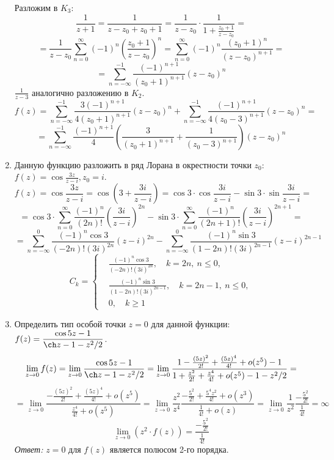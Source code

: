 \documentclass[14pt, a4paper, titlepage, fleqn]{extarticle}
\newcommand{\otv}{\textit{Ответ:} }
\begin{document}
\begin{enumerate}
        Разложим в \( K_3 \): 
        \[
            \frac{1}{z+1} = \frac{1}{z-z_0+z_0+1} = \frac{1}{z-z_0} \cdot \frac{1}{1+\frac{z_0+1}{z-z_0}} =
        \]
        \[
            = \frac{1}{z-z_0} \sum_{n=0}^{\infty} (-1)^n \left( \frac{z_0+1}{z-z_0} \right)^n = \sum_{n=0}^{\infty} (-1)^n \frac{(z_0+1)^n}{(z-z_0)^{n+1}} =
        \]
        \[
            = \sum_{n=-\infty}^{-1} \frac{(-1)^{n+1}}{(z_0+1)^{n+1}} (z-z_0)^n
        \]
        \( \displaystyle \frac{1}{z-3} \) аналогично разложению в \( K_2 \). 
        \[
            f(z) = \sum_{n=-\infty}^{-1} \frac{3(-1)^{n+1}}{4(z_0+1)^{n+1}} (z-z_0)^n + \sum_{n=-\infty}^{-1} \frac{(-1)^{n+1}}{4(z_0-3)^{n+1}} (z-z_0)^n =
        \]
        \[
            = \sum_{n=-\infty}^{-1} \frac{(-1)^{n+1}}{4} \left( \frac{3}{(z_0+1)^{n+1}} + \frac{1}{(z_0-3)^{n+1}}\right) (z-z_0)^n
        \]

        
        \pagebreak

        \item Данную функцию разложить в ряд Лорана в окрестности точки \( z_0 \): \( \displaystyle f(z) = \cos \frac{3z}{z-i}, z_0 = i \).
        \[
            f(z) = \cos \frac{3z}{z-i} = \cos \left( 3 + \frac{3i}{z-i} \right) = \cos 3 \cdot \cos \frac{3i}{z-i} - \sin 3 \cdot \sin \frac{3i}{z-i} =
        \]
        \[
            = \cos 3 \cdot \sum_{n=0}^{\infty} \frac{(-1)^n}{(2n)!} \left( \frac{3i}{z-i} \right)^{2n}  - \sin 3 \cdot \sum_{n=0}^{\infty} \frac{(-1)^n}{(2n+1)!} \left( \frac{3i}{z-i} \right)^{2n+1} =
        \]
        \[
            = \sum_{n=-\infty}^{0} \frac{(-1)^n \cos 3}{(-2n)! (3i)^{2n}} \left( z-i \right)^{2n}  - \sum_{n=-\infty}^{0} \frac{(-1)^n \sin 3}{(1-2n)! (3i)^{2n-1}} \left( z-i \right)^{2n-1}
        \]
        \[
            C_k = \left\lbrace
                \begin{aligned}
                    &\frac{(-1)^n \cos 3}{(-2n)! (3i)^{2n}}, \quad k = 2n, ~ n \leq 0, \\
                    &\frac{(-1)^n \sin 3}{(1-2n)! (3i)^{2n-1}}, \quad k = 2n-1, ~ n \leq 0, \\
                    &0, \quad k \geq 1
                \end{aligned}
            \right.
        \]  

        \item Определить тип особой точки \( z = 0 \) для данной функции: \( \displaystyle f(z) = \frac{\cos 5z -1 }{\ch z - 1 - z^2/2} \).
        \[
            \lim\limits_{z\to 0} f(z) = \lim\limits_{z\to 0} \frac{\cos 5z -1 }{\ch z - 1 - z^2/2} =
            \lim\limits_{z\to 0} \frac{1 - \frac{(5z)^2}{2!} + \frac{(5z)^4}{4!} + o(z^5) -1 }{1 + \frac{z^2}{2!} + \frac{z^4}{4!} + o(z^5) - 1 - z^2/2} =
        \]
        \[
            = \lim\limits_{z\to 0} \frac{-\frac{(5z)^2}{2!} + \frac{(5z)^4}{4!} + o(z^5)}{\frac{z^4}{4!} + o(z^5)} = 
            \lim\limits_{z\to 0} \frac{z^2}{z^4} \frac{-\frac{5^2}{2!} + \frac{5^4 z^2}{4!} + o(z^3)}{\frac{1}{4!} + o(z)} = 
            \lim\limits_{z\to 0} \frac{1}{z^2} \frac{-\frac{5^2}{2!}}{\frac{1}{4!}} = \infty
        \]
        \[
            \lim\limits_{z\to 0} \left( z^2 \cdot f(z) \right) = \frac{-\frac{5^2}{2!}}{\frac{1}{4!}}
        \]
        \otv \( z = 0 \) для \( f(z) \) является полюсом 2-го порядка.


\end{enumerate}
\end{document}
